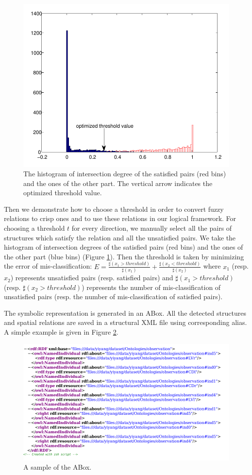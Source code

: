 \documentclass{article}
\begin{document}
\begin{figure}[h]
 \centering
 \includegraphics[width=.5\textwidth]{./figures/right_nright_arrowthresh_crop.pdf}
 \caption{\label{fig:thresh}The histogram of intersection degree of the satisfied pairs (red bins) and the ones of the other part. The vertical arrow indicates the optimized threshold value.}
\end{figure}

Then we demonstrate how to choose a threshold in order to convert fuzzy relations to crisp ones and to use these relations in our logical framework.
For choosing a threshold $t$ for every direction, we manually select all the pairs of structures which satisfy the relation and all the unsatisfied pairs.
We take the histogram of intersection degrees of the satisfied pairs (red bins) and the ones of the other part (blue bins) (Figure \ref{fig:thresh}).
Then the threshold is taken by minimizing the error of mis-classification:
$E=\frac{\sharp(x_1>threshold)}{\sharp(x_1)}+\frac{\sharp(x_2<threshold)}{\sharp(x_2)}$ where $x_1$ (resp. $x_2$) represents unsatisfied pairs (resp. satisfied pairs) 
and $\sharp(x_1>threshold)$ (resp. $\sharp(x_2>threshold)$) represents the number of mis-classification of unsatisfied pairs (resp. the number of mis-classification of satisfied pairs).

The symbolic representation is generated in an ABox. All the detected structures and spatial relations are saved in a structural XML file using corresponding alias.
A simple example is given in Figure \ref{fig:owlfile}.
\begin{figure}[h]
 \centering
 \includegraphics[width=.8\textwidth]{./figures/xml_screenshot.png}
 \caption{\label{fig:owlfile}A sample of the ABox.}
\end{figure}
\end{document}
